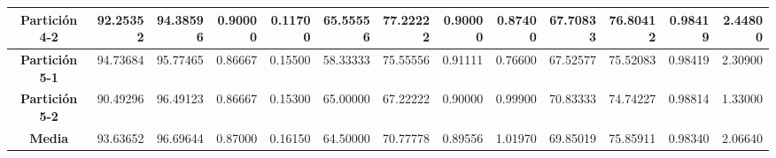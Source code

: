 \documentclass[a4paper,11pt]{article}
\begin{document}
\begin{table}[H]
\begin{adjustbox}{width=1.1\textwidth}
\begin{tabular}{|c|r|r|r|r|r|r|r|r|r|r|r|r|}
    \textbf{Partición 4-2} & 92.25352 & 94.38596 & 0.90000 & 0.11700 & 65.55556 & 77.22222 & 0.90000 & 0.87400 & 67.70833 & 76.80412 & 0.98419 & 2.44800 \\ \hline
    \textbf{Partición 5-1} & 94.73684 & 95.77465 & 0.86667 & 0.15500 & 58.33333 & 75.55556 & 0.91111 & 0.76600 & 67.52577 & 75.52083 & 0.98419 & 2.30900 \\ \hline
    \textbf{Partición 5-2} & 90.49296 & 96.49123 & 0.86667 & 0.15300 & 65.00000 & 67.22222 & 0.90000 & 0.99900 & 70.83333 & 74.74227 & 0.98814 & 1.33000 \\ \hline
    \textbf{Media} & 93.63652 & 96.69644 & 0.87000 & 0.16150 & 64.50000 & 70.77778 & 0.89556 & 1.01970 & 69.85019 & 75.85911 & 0.98340 & 2.06640 \\ \hline
    \end{tabular}
    \end{adjustbox}
    \label{SFS}
  \end{table}
  
\end{document}
